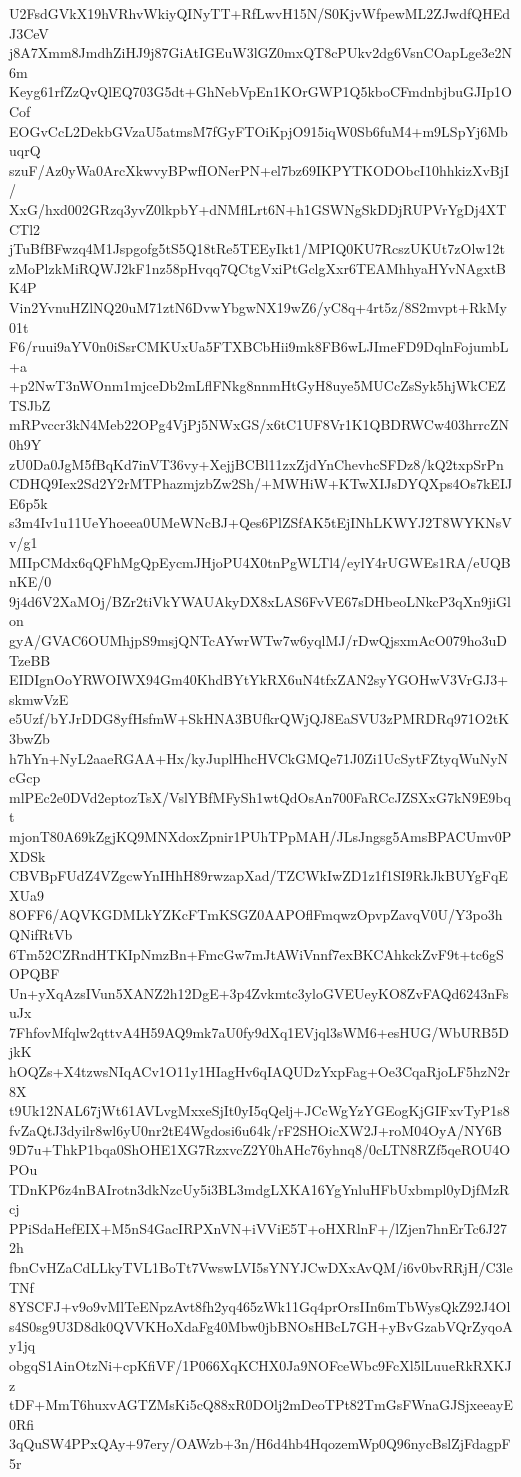 U2FsdGVkX19hVRhvWkiyQINyTT+RfLwvH15N/S0KjvWfpewML2ZJwdfQHEdJ3CeV
j8A7Xmm8JmdhZiHJ9j87GiAtIGEuW3lGZ0mxQT8cPUkv2dg6VsnCOapLge3e2N6m
Keyg61rfZzQvQlEQ703G5dt+GhNebVpEn1KOrGWP1Q5kboCFmdnbjbuGJIp1OCof
EOGvCcL2DekbGVzaU5atmsM7fGyFTOiKpjO915iqW0Sb6fuM4+m9LSpYj6MbuqrQ
szuF/Az0yWa0ArcXkwvyBPwfIONerPN+el7bz69IKPYTKODObcI10hhkizXvBjI/
XxG/hxd002GRzq3yvZ0lkpbY+dNMflLrt6N+h1GSWNgSkDDjRUPVrYgDj4XTCTl2
jTuBfBFwzq4M1Jspgofg5tS5Q18tRe5TEEyIkt1/MPIQ0KU7RcszUKUt7zOlw12t
zMoPlzkMiRQWJ2kF1nz58pHvqq7QCtgVxiPtGclgXxr6TEAMhhyaHYvNAgxtBK4P
Vin2YvnuHZlNQ20uM71ztN6DvwYbgwNX19wZ6/yC8q+4rt5z/8S2mvpt+RkMy01t
F6/ruui9aYV0n0iSsrCMKUxUa5FTXBCbHii9mk8FB6wLJImeFD9DqlnFojumbL+a
+p2NwT3nWOnm1mjceDb2mLflFNkg8nnmHtGyH8uye5MUCcZsSyk5hjWkCEZTSJbZ
mRPvccr3kN4Meb22OPg4VjPj5NWxGS/x6tC1UF8Vr1K1QBDRWCw403hrrcZN0h9Y
zU0Da0JgM5fBqKd7inVT36vy+XejjBCBl11zxZjdYnChevhcSFDz8/kQ2txpSrPn
CDHQ9Iex2Sd2Y2rMTPhazmjzbZw2Sh/+MWHiW+KTwXIJsDYQXps4Os7kEIJE6p5k
s3m4Iv1u11UeYhoeea0UMeWNcBJ+Qes6PlZSfAK5tEjINhLKWYJ2T8WYKNsVv/g1
MIIpCMdx6qQFhMgQpEycmJHjoPU4X0tnPgWLTl4/eylY4rUGWEs1RA/eUQBnKE/0
9j4d6V2XaMOj/BZr2tiVkYWAUAkyDX8xLAS6FvVE67sDHbeoLNkcP3qXn9jiGlon
gyA/GVAC6OUMhjpS9msjQNTcAYwrWTw7w6yqlMJ/rDwQjsxmAcO079ho3uDTzeBB
EIDIgnOoYRWOIWX94Gm40KhdBYtYkRX6uN4tfxZAN2syYGOHwV3VrGJ3+skmwVzE
e5Uzf/bYJrDDG8yfHsfmW+SkHNA3BUfkrQWjQJ8EaSVU3zPMRDRq971O2tK3bwZb
h7hYn+NyL2aaeRGAA+Hx/kyJuplHhcHVCkGMQe71J0Zi1UcSytFZtyqWuNyNcGcp
mlPEc2e0DVd2eptozTsX/VslYBfMFySh1wtQdOsAn700FaRCcJZSXxG7kN9E9bqt
mjonT80A69kZgjKQ9MNXdoxZpnir1PUhTPpMAH/JLsJngsg5AmsBPACUmv0PXDSk
CBVBpFUdZ4VZgcwYnIHhH89rwzapXad/TZCWkIwZD1z1f1SI9RkJkBUYgFqEXUa9
8OFF6/AQVKGDMLkYZKcFTmKSGZ0AAPOflFmqwzOpvpZavqV0U/Y3po3hQNifRtVb
6Tm52CZRndHTKIpNmzBn+FmcGw7mJtAWiVnnf7exBKCAhkckZvF9t+tc6gSOPQBF
Un+yXqAzsIVun5XANZ2h12DgE+3p4Zvkmtc3yloGVEUeyKO8ZvFAQd6243nFsuJx
7FhfovMfqlw2qttvA4H59AQ9mk7aU0fy9dXq1EVjql3sWM6+esHUG/WbURB5DjkK
hOQZs+X4tzwsNIqACv1O11y1HIagHv6qIAQUDzYxpFag+Oe3CqaRjoLF5hzN2r8X
t9Uk12NAL67jWt61AVLvgMxxeSjIt0yI5qQelj+JCcWgYzYGEogKjGIFxvTyP1s8
fvZaQtJ3dyilr8wl6yU0nr2tE4Wgdosi6u64k/rF2SHOicXW2J+roM04OyA/NY6B
9D7u+ThkP1bqa0ShOHE1XG7RzxvcZ2Y0hAHc76yhnq8/0cLTN8RZf5qeROU4OPOu
TDnKP6z4nBAIrotn3dkNzcUy5i3BL3mdgLXKA16YgYnluHFbUxbmpl0yDjfMzRcj
PPiSdaHefEIX+M5nS4GacIRPXnVN+iVViE5T+oHXRlnF+/lZjen7hnErTc6J272h
fbnCvHZaCdLLkyTVL1BoTt7VwswLVI5sYNYJCwDXxAvQM/i6v0bvRRjH/C3leTNf
8YSCFJ+v9o9vMlTeENpzAvt8fh2yq465zWk11Gq4prOrsIIn6mTbWysQkZ92J4Ol
s4S0sg9U3D8dk0QVVKHoXdaFg40Mbw0jbBNOsHBcL7GH+yBvGzabVQrZyqoAy1jq
obgqS1AinOtzNi+cpKfiVF/1P066XqKCHX0Ja9NOFceWbc9FcXl5lLuueRkRXKJz
tDF+MmT6huxvAGTZMsKi5cQ88xR0DOlj2mDeoTPt82TmGsFWnaGJSjxeeayE0Rfi
3qQuSW4PPxQAy+97ery/OAWzb+3n/H6d4hb4HqozemWp0Q96nycBslZjFdagpF5r
